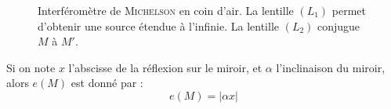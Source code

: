 \documentclass[11pt,a4paper,fleqn,pdftex]{report}
\begin{document}
\begin{figure}[h!t]
   \caption[Interféromètre de \textsc{Michelson} en coin d'air]{Interféromètre de \textsc{Michelson} en coin d'air. La lentille $(L_1)$ permet d'obtenir une source étendue à l'infinie. La lentille $(L_2)$ conjugue $M$ à $M'$.}
   \label{fig:michelson_coin_d_air}
\end{figure}
\begin{theorem}
   Si on note $x$ l'abscisse de la réflexion sur le miroir, et $\alpha$ l'inclinaison du miroir, alors $e(M)$ est donné par :
   \begin{equation}
   e(M) = |\alpha x |
   \end{equation}
\end{theorem}
\FloatBarrier
\end{document}
